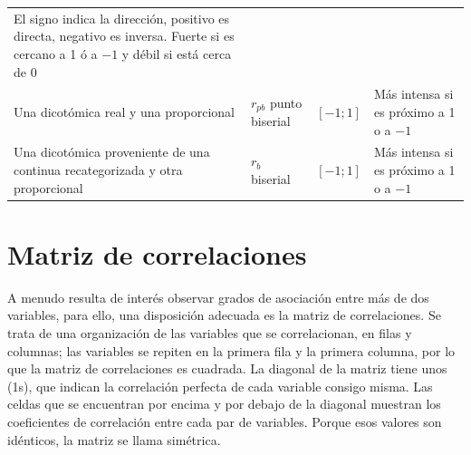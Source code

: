 \documentclass[]{book}
\begin{document}
\begin{longtable}[]{@{}llcl@{}}
\begin{minipage}[t]{0.38\columnwidth}
El signo indica la dirección, positivo es directa, negativo es inversa. Fuerte si es cercano a 1 ó a \(-1\) y débil si está cerca de 0\strut
\end{minipage}\tabularnewline
\begin{minipage}[t]{0.22\columnwidth}\raggedright
Una dicotómica real y una proporcional\strut
\end{minipage} & \begin{minipage}[t]{0.14\columnwidth}\raggedright
\(r_{pb}\) punto biserial\strut
\end{minipage} & \begin{minipage}[t]{0.15\columnwidth}\centering
\([-1; 1]\)\strut
\end{minipage} & \begin{minipage}[t]{0.38\columnwidth}\raggedright
Más intensa si es próximo a 1 o a \(-1\)\strut
\end{minipage}\tabularnewline
\begin{minipage}[t]{0.22\columnwidth}\raggedright
Una dicotómica proveniente de una continua recategorizada y otra proporcional\strut
\end{minipage} & \begin{minipage}[t]{0.14\columnwidth}\raggedright
\(r_b\) biserial\strut
\end{minipage} & \begin{minipage}[t]{0.15\columnwidth}\centering
\([-1; 1]\)\strut
\end{minipage} & \begin{minipage}[t]{0.38\columnwidth}\raggedright
Más intensa si es próximo a 1 o a \(-1\)\strut
\end{minipage}\tabularnewline
\bottomrule
\end{longtable}

\hypertarget{matriz-de-correlaciones}{%
\section{Matriz de correlaciones}\label{matriz-de-correlaciones}}

A menudo resulta de interés observar grados de asociación entre más de dos variables, para ello, una disposición adecuada es la matriz de correlaciones. Se trata de una organización de las variables que se correlacionan, en filas y columnas; las variables se repiten en la primera fila y la primera columna, por lo que la matriz de correlaciones es cuadrada. La diagonal de la matriz tiene unos (1s), que indican la correlación perfecta de cada variable consigo misma. Las celdas que se encuentran por encima y por debajo de la diagonal muestran los coeficientes de correlación entre cada par de variables. Porque esos valores son idénticos, la matriz se llama simétrica.
\end{document}
